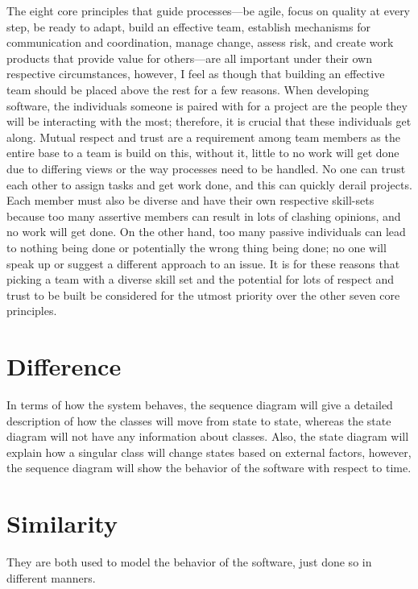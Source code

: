 	The eight core principles that guide processes—be agile, focus on quality at every step, be ready to adapt, build an effective team, establish mechanisms for communication and coordination, manage change, assess risk, and create work products that provide value for others—are all important under their own respective circumstances, however, I feel as though that building an effective team should be placed above the rest for a few reasons. When developing software, the individuals someone is paired with for a project are the people they will be interacting with the most; therefore, it is crucial that these individuals get along. Mutual respect and trust are a requirement among team members as the entire base to a team is build on this, without it, little to no work will get done due to differing views or the way processes need to be handled. No one can trust each other to assign tasks and get work done, and this can quickly derail projects. Each member must also be diverse and have their own respective skill-sets because too many assertive members can result in lots of clashing opinions, and no work will get done. On the other hand, too many passive individuals can lead to nothing being done or potentially the wrong thing being done; no one will speak up or suggest a different approach to an issue. It is for these reasons that picking a team with a diverse skill set and the potential for lots of respect and trust to be built be considered for the utmost priority over the other seven core principles.








	\part{Difference}
		In terms of how the system behaves, the sequence diagram will give a detailed description of how the classes will move from state to state, whereas the state diagram will not have any information about classes. Also, the state diagram will explain how a singular class will change states based on external factors, however, the sequence diagram will show the behavior of the software with respect to time.
	
	\part{Similarity}
		They are both used to model the behavior of the software, just done so in different manners.

